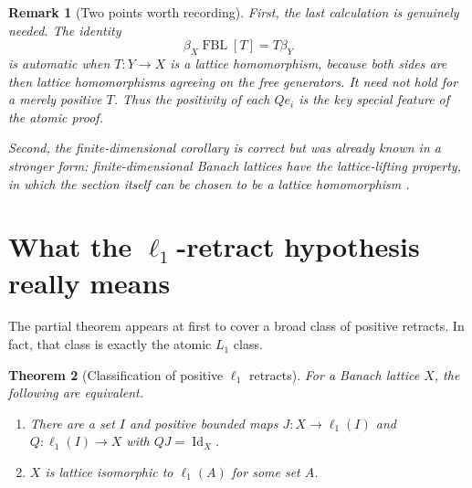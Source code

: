 \documentclass[11pt]{article}
\newtheorem{theorem}{Theorem}[section]
\newtheorem{remark}[theorem]{Remark}
\newcommand{\FBL}{\operatorname{FBL}}
\newcommand{\Id}{\operatorname{Id}}
\begin{document}
\begin{remark}[Two points worth recording]\label{rem:functoriality}
First, the last calculation is genuinely needed.  The identity
\[
 \beta_X\FBL[T]=T\beta_Y
\]
is automatic when $T:Y\to X$ is a lattice homomorphism, because both sides
are then lattice homomorphisms agreeing on the free generators.  It need not
hold for a merely positive $T$.  Thus the positivity of each $Qe_i$ is the key
special feature of the atomic proof.

Second, the finite-dimensional corollary is correct but was already known in
a stronger form: finite-dimensional Banach lattices have the lattice-lifting
property, in which the section itself can be chosen to be a lattice
homomorphism \cite[Proposition~2.2]{AvilesEtAl2022}.
\end{remark}

\section{What the $\ell_1$-retract hypothesis really means}

The partial theorem appears at first to cover a broad class of positive
retracts.  In fact, that class is exactly the atomic $L_1$ class.

\begin{theorem}[Classification of positive $\ell_1$ retracts]\label{thm:classify}
For a Banach lattice $X$, the following are equivalent.
\begin{enumerate}[label=(\alph*),leftmargin=2.2em]
\item There are a set $I$ and positive bounded maps
$J:X\to\ell_1(I)$ and $Q:\ell_1(I)\to X$ with $QJ=\Id_X$.
\item $X$ is lattice isomorphic to $\ell_1(A)$ for some set $A$.
\end{enumerate}
\end{theorem}
\end{document}
